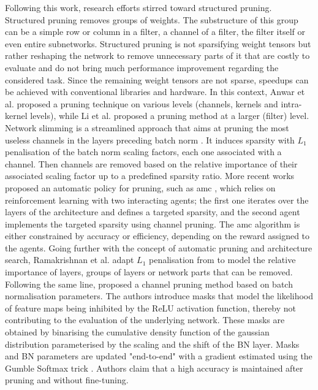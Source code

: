 Following this work, research efforts stirred toward structured pruning.
Structured pruning removes groups of weights. The substructure of this group can
be a simple row or column in a filter, a channel of a filter, the filter itself
or even entire subnetworks. Structured pruning is not sparsifying weight tensors
but rather reshaping the network to remove unnecessary parts of it that are
costly to evaluate and do not bring much performance improvement regarding the
considered task. Since the remaining weight tensors are not sparse, speedups can
be achieved with conventional libraries and hardware. In this context, Anwar et
al. \cite{anwar2017structured} proposed a pruning technique on various levels
(channels, kernels and intra-kernel levels), while Li et al.
\cite{DBLP:conf/iclr/0022KDSG17} proposed a pruning method at a larger (filter)
level. Network slimming \cite{DBLP:conf/iccv/LiuLSHYZ17} is a streamlined
approach that aims at pruning the most useless channels in the layers preceding
\ac{batch norm} \cite{DBLP:conf/icml/IoffeS15}. It induces sparsity with
$L_1$ penalisation of the \ac{batch norm} scaling factors, each one
associated with a channel. Then channels are removed based on the relative
importance of their associated scaling factor up to a predefined sparsity ratio.
More recent works proposed an automatic policy for pruning, such as \ac{amc}
\cite{DBLP:conf/eccv/HeLLWLH18}, which relies on reinforcement learning with two
interacting agents; the first one iterates over the layers of the architecture
and defines a targeted sparsity, and the second agent implements the targeted
sparsity using channel pruning. The \ac{amc} algorithm is either constrained by
accuracy or efficiency, depending on the reward assigned to the agents. Going
further with the concept of automatic pruning and architecture search,
Ramakrishnan et al. \cite{DBLP:conf/crv/RamakrishnanSN20} adapt $L_1$
penalisation from \cite{DBLP:conf/iccv/LiuLSHYZ17} to model the relative
importance of layers, groups of layers or network parts that can be removed.
Following the same line, \cite{DBLP:conf/icml/KangH20} proposed a channel
pruning method based on batch normalisation parameters. The authors introduce
masks that model the likelihood of feature maps being inhibited by the ReLU
activation function, thereby not contributing to the evaluation of the
underlying network. These masks are obtained by binarising the cumulative
density function of the gaussian distribution parameterised by the scaling and
the shift of the BN layer. Masks and BN parameters are updated "end-to-end" with
a gradient estimated using the Gumble Softmax trick
\cite{DBLP:conf/iclr/JangGP17}. Authors claim that a high accuracy is maintained
after pruning and without fine-tuning. \\



